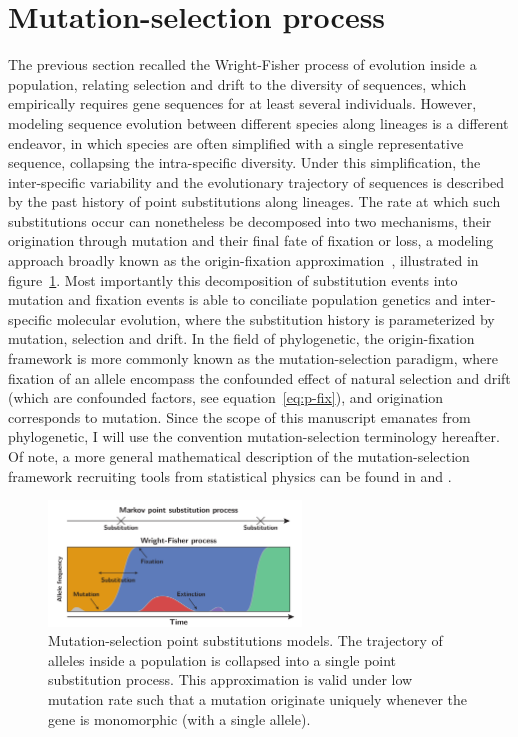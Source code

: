 \section{Mutation-selection process}
The previous section recalled the Wright-Fisher process of evolution inside a population, relating selection and drift to the diversity of sequences, which empirically requires gene sequences for at least several individuals.
However, modeling sequence evolution between different species along lineages is a different endeavor, in which species are often simplified with a single representative sequence, collapsing the intra-specific diversity.
Under this simplification, the inter-specific variability and the evolutionary trajectory of sequences is described by the past history of point \glspl{substitution} along lineages.
The rate at which such \glspl{substitution} occur can nonetheless be decomposed into two mechanisms, their origination through mutation and their final fate of fixation or loss, a modeling approach broadly known as the origin-fixation approximation~\citep{McCandlish2014}, illustrated in figure~\ref{fig:point-process}.
Most importantly this decomposition of \gls{substitution} events into mutation and fixation events is able to conciliate population genetics and inter-specific molecular evolution, where the \gls{substitution} history is parameterized by mutation, selection and drift.
In the field of phylogenetic, the origin-fixation framework is more commonly known as the mutation-selection paradigm, where fixation of an \gls{allele} encompass the confounded effect of natural selection and drift (which are confounded factors, see equation~\ref{eq:p-fix}), and origination corresponds to mutation.
Since the scope of this manuscript emanates from phylogenetic, I will use the convention mutation-selection terminology hereafter.
Of note, a more general mathematical description of the mutation-selection framework recruiting tools from statistical physics can be found in \citet{Sella2005} and \citet{Mustonen2009}.

\begin{figure}[H]
    \centering
    \includegraphics[width=0.6\textwidth]{figures/point-process.pdf}
    \caption[Mutation-selection point substitutions]{
    Mutation-selection point \glspl{substitution} models.
    The trajectory of \glspl{allele} inside a population is collapsed into a single point \gls{substitution} process.
    This approximation is valid under low mutation rate such that a mutation originate uniquely whenever the gene is monomorphic (with a single allele).}
    \label{fig:point-process}
\end{figure}

